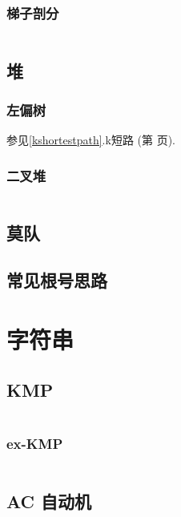 \documentclass[a4paper, twoside]{article}
\begin{document}
\begin{multicols}{2}
				\subsubsection{梯子剖分}
					\inputminted{cpp}{../src/datastructure/梯子剖分.cpp}
			
			\subsection{堆}

				\subsubsection{左偏树}
					参见\ref{kshortestpath}.k短路 (第 \pageref{kshortestpath} 页).
				
				\subsubsection{二叉堆}
					\inputminted{cpp}{../src/datastructure/二叉堆.cpp}
			
			\subsection{莫队}
				
	
			\subsection{常见根号思路}
				

		\newpage
		\section{字符串}
			\subsection{KMP}
				\inputminted{cpp}{../src/string/KMP.cpp}
				
				\subsubsection{ex-KMP}
					\inputminted{cpp}{../src/string/exKMP.cpp}

			\subsection{AC 自动机}
				\inputminted{cpp}{../src/string/AC自动机.cpp}


\end{multicols}
\end{document}
